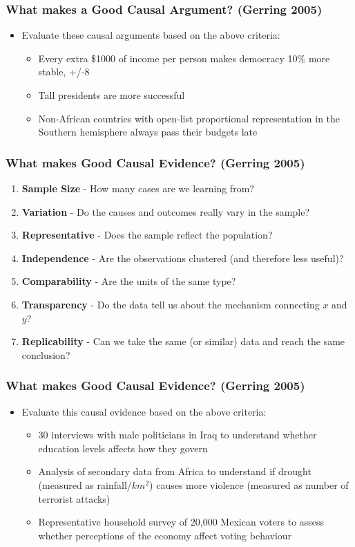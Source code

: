 \documentclass[xcolor=x11names,compress]{beamer}\usepackage[]{graphicx}\usepackage[]{color}
\renewcommand{\(}{\begin{columns}}
\renewcommand{\)}{\end{columns}}
\newcommand{\<}[1]{\begin{column}{#1}}
\renewcommand{\>}{\end{column}}
\begin{document}
\begin{frame}
\frametitle{What makes a Good Causal Argument? (Gerring 2005)}
\begin{itemize}
\item Evaluate these causal arguments based on the above criteria:
\begin{itemize}
\item Every extra \$1000 of income per person makes democracy 10\% more stable, +/-8%
\item Tall presidents are more successful
\item Non-African countries with open-list proportional representation in the Southern hemisphere always pass their budgets late
\end{itemize}
\end{itemize}
\end{frame}

\begin{frame}
\frametitle{What makes Good Causal Evidence? (Gerring 2005)}
\begin{enumerate}
\item \textbf{Sample Size} - How many cases are we learning from?
\item \textbf{Variation} - Do the causes and outcomes really vary in the sample?
\item \textbf{Representative} - Does the sample reflect the population?
\item \textbf{Independence} - Are the observations clustered (and therefore less useful)?
\item \textbf{Comparability} - Are the units of the same type?
\item \textbf{Transparency} - Do the data tell us about the mechanism connecting $x$ and $y$?
\item \textbf{Replicability} - Can we take the same (or similar) data and reach the same conclusion?
\end{enumerate}
\end{frame}

\begin{frame}
\frametitle{What makes Good Causal Evidence? (Gerring 2005)}
\begin{itemize}
\item Evaluate this causal evidence based on the above criteria:
\begin{itemize}
\item 30 interviews with male politicians in Iraq to understand whether education levels affects how they govern
\item Analysis of secondary data from Africa to understand if drought (measured as rainfall/$km^2$) causes more violence (measured as number of terrorist attacks)
\item Representative household survey of 20,000 Mexican voters to assess whether perceptions of the economy affect voting behaviour
\end{itemize}
\end{itemize}
\end{frame}
\end{document}
